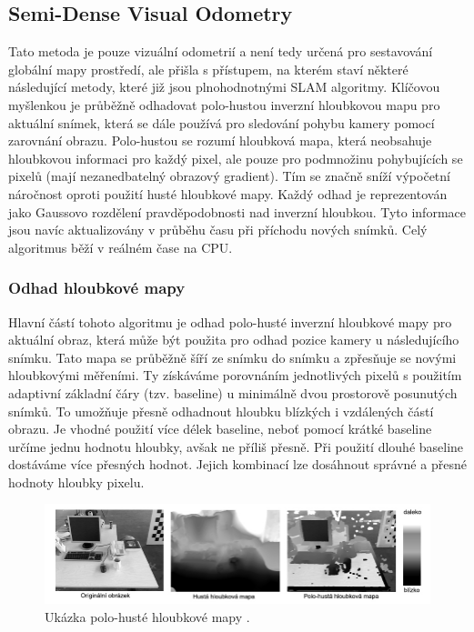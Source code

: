 \documentclass[12pt,a4paper]{article}
\begin{document}
\subsection{Semi-Dense Visual Odometry}
Tato metoda je pouze vizuální odometrií a není tedy určená pro sestavování globální mapy prostředí, ale přišla s přístupem, na kterém staví některé následující metody, které již jsou plnohodnotnými SLAM algoritmy. Klíčovou myšlenkou je průběžně odhadovat polo-hustou inverzní hloubkovou mapu pro aktuální snímek, která se dále používá pro sledování pohybu kamery pomocí zarovnání obrazu. Polo-hustou se rozumí hloubková mapa, která neobsahuje hloubkovou informaci pro každý pixel, ale pouze pro podmnožinu pohybujících se pixelů (mají nezanedbatelný obrazový gradient). Tím se značně sníží výpočetní náročnost oproti použití husté hloubkové mapy. Každý odhad je reprezentován jako Gaussovo rozdělení pravděpodobnosti nad inverzní hloubkou. Tyto informace jsou navíc aktualizovány v průběhu času při příchodu nových snímků. Celý algoritmus běží v reálném čase na CPU.

\subsubsection*{Odhad hloubkové mapy}
Hlavní částí tohoto algoritmu je odhad polo-husté inverzní hloubkové mapy pro aktuální obraz, která může být použita pro odhad pozice kamery u následujícího snímku. Tato mapa se průběžně šíří ze snímku do snímku a zpřesňuje se novými hloubkovými měřeními. Ty získáváme porovnáním jednotlivých pixelů s použitím adaptivní základní čáry (tzv. baseline) u minimálně dvou prostorově posunutých snímků. To umožňuje přesně odhadnout hloubku blízkých i vzdálených částí obrazu. Je vhodné použití více délek baseline, neboť pomocí krátké baseline určíme jednu hodnotu hloubky, avšak ne příliš přesně. Při použití dlouhé baseline dostáváme více přesných hodnot. Jejich kombinací lze dosáhnout správné a přesné hodnoty hloubky pixelu.

\begin{figure}[H]
\centering
\includegraphics[scale=0.7]{img/hloubkova_mapa.jpg}
\caption{Ukázka polo-husté hloubkové mapy \cite{Semi-Dense_VO}.}
\end{figure}
\end{document}
